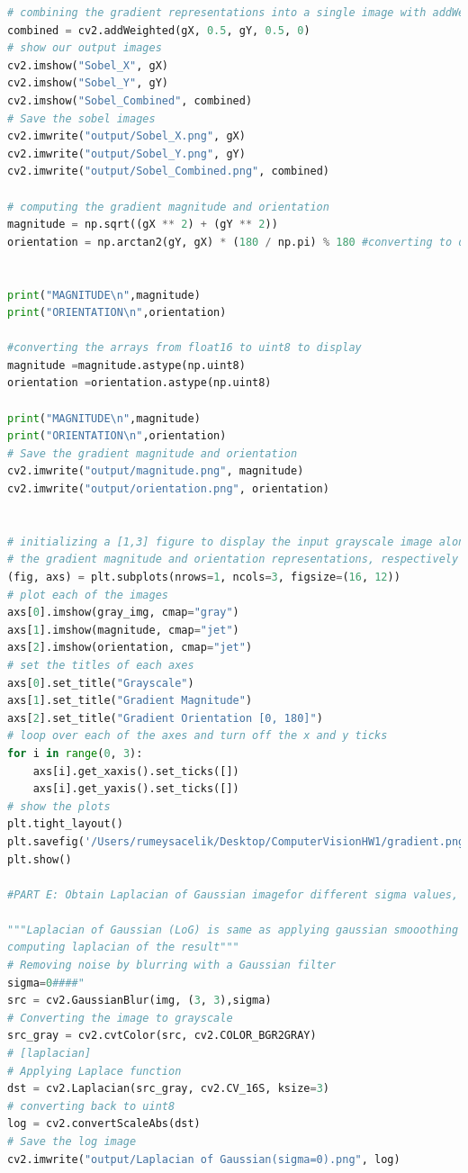 \documentclass[a4paper, 12pt]{report}
\begin{document}
\begin{lstlisting}[language=Python]
# combining the gradient representations into a single image with addWeighted by giving them equal weight
combined = cv2.addWeighted(gX, 0.5, gY, 0.5, 0)
# show our output images
cv2.imshow("Sobel_X", gX)
cv2.imshow("Sobel_Y", gY)
cv2.imshow("Sobel_Combined", combined)
# Save the sobel images
cv2.imwrite("output/Sobel_X.png", gX)
cv2.imwrite("output/Sobel_Y.png", gY)
cv2.imwrite("output/Sobel_Combined.png", combined)

# computing the gradient magnitude and orientation
magnitude = np.sqrt((gX ** 2) + (gY ** 2))
orientation = np.arctan2(gY, gX) * (180 / np.pi) % 180 #converting to degree


print("MAGNITUDE\n",magnitude)
print("ORIENTATION\n",orientation)

#converting the arrays from float16 to uint8 to display
magnitude =magnitude.astype(np.uint8)
orientation =orientation.astype(np.uint8)

print("MAGNITUDE\n",magnitude)
print("ORIENTATION\n",orientation)
# Save the gradient magnitude and orientation 
cv2.imwrite("output/magnitude.png", magnitude)
cv2.imwrite("output/orientation.png", orientation)


# initializing a [1,3] figure to display the input grayscale image along with
# the gradient magnitude and orientation representations, respectively
(fig, axs) = plt.subplots(nrows=1, ncols=3, figsize=(16, 12))
# plot each of the images
axs[0].imshow(gray_img, cmap="gray")
axs[1].imshow(magnitude, cmap="jet")
axs[2].imshow(orientation, cmap="jet")
# set the titles of each axes
axs[0].set_title("Grayscale")
axs[1].set_title("Gradient Magnitude")
axs[2].set_title("Gradient Orientation [0, 180]")
# loop over each of the axes and turn off the x and y ticks
for i in range(0, 3):
	axs[i].get_xaxis().set_ticks([])
	axs[i].get_yaxis().set_ticks([])
# show the plots
plt.tight_layout()
plt.savefig('/Users/rumeysacelik/Desktop/ComputerVisionHW1/gradient.png')
plt.show()

#PART E: Obtain Laplacian of Gaussian imagefor different sigma values, and displaythe results.

"""Laplacian of Gaussian (LoG) is same as applying gaussian smooothing filter first and then 
computing laplacian of the result"""
# Removing noise by blurring with a Gaussian filter
sigma=0####"
src = cv2.GaussianBlur(img, (3, 3),sigma)
# Converting the image to grayscale
src_gray = cv2.cvtColor(src, cv2.COLOR_BGR2GRAY)
# [laplacian]
# Applying Laplace function
dst = cv2.Laplacian(src_gray, cv2.CV_16S, ksize=3)
# converting back to uint8
log = cv2.convertScaleAbs(dst)
# Save the log image
cv2.imwrite("output/Laplacian of Gaussian(sigma=0).png", log)


\end{lstlisting}
\end{document}
